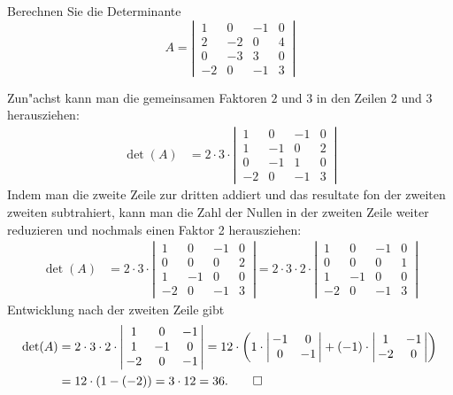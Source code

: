 Berechnen Sie die Determinante 
\[
A=\left|\,\begin{matrix}
 1& 0&-1&0\\
 2&-2& 0&4\\
 0&-3& 3&0\\
-2& 0&-1&3
\end{matrix}\,\right|
\]

\begin{loesung}
Zun"achst kann man die gemeinsamen Faktoren $2$ und $3$ in den Zeilen 2 und 3
herausziehen:
\begin{align*}
\det(A)
&=
2\cdot 3\cdot
\left|\,\begin{matrix}
 1& 0&-1&0\\
 1&-1& 0&2\\
 0&-1& 1&0\\
-2& 0&-1&3
\end{matrix}\,\right|
\end{align*}
Indem man die zweite Zeile zur dritten addiert und das resultate fon der zweiten
zweiten subtrahiert,
kann man die Zahl der Nullen in der zweiten Zeile weiter reduzieren und
nochmals einen Faktor 2 herausziehen:
\begin{align*}
\det(A)
&=
2\cdot 3\cdot
\left|\,\begin{matrix}
 1& 0&-1&0\\
 0& 0& 0&2\\
 1&-1& 0&0\\
-2& 0&-1&3
\end{matrix}\,\right|
=
2\cdot 3\cdot2\cdot
\left|\,\begin{matrix}
 1& 0&-1&0\\
 0& 0& 0&1\\
 1&-1& 0&0\\
-2& 0&-1&3
\end{matrix}\,\right|
\end{align*}
Entwicklung nach der zweiten Zeile gibt
\begin{align*}
\det(A)
&=
2\cdot 3\cdot2\cdot
\left|\,\begin{matrix}
 1& 0&-1\\
 1&-1& 0\\
-2& 0&-1
\end{matrix}\,\right|
=
12\cdot \biggl(
1\cdot
\left|\,\begin{matrix}-1& 0\\ 0&-1\end{matrix}\,\right|
+
(-1)\cdot
\left|\,\begin{matrix} 1&-1\\-2& 0\end{matrix}\,\right|
\biggr)
\\
&=12\cdot(1-(-2))=3\cdot 12=36.
\qedhere
\end{align*}


\end{loesung}
